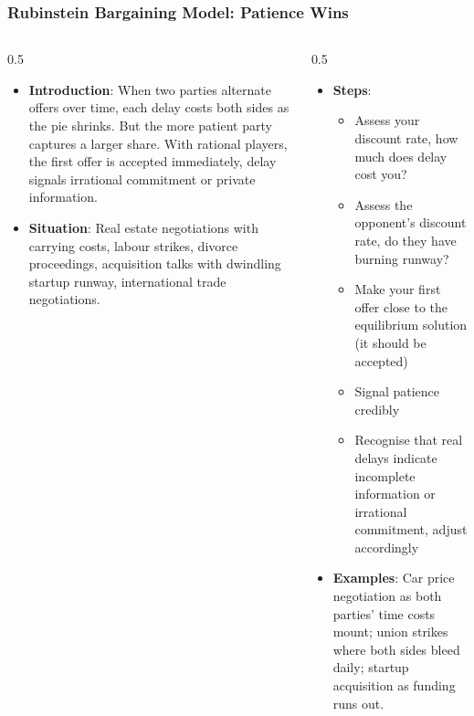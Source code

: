 \begin{frame}[fragile]\frametitle{Rubinstein Bargaining Model: Patience Wins}
\begin{columns}
    \begin{column}[T]{0.5\linewidth}
      \begin{itemize}
        \item \textbf{Introduction}: When two parties alternate offers over time, each delay costs both sides as the pie shrinks. But the more patient party captures a larger share. With rational players, the first offer is accepted immediately, delay signals irrational commitment or private information.
        \item \textbf{Situation}: Real estate negotiations with carrying costs, labour strikes, divorce proceedings, acquisition talks with dwindling startup runway, international trade negotiations.
      \end{itemize}
    \end{column}
    \begin{column}[T]{0.5\linewidth}
      \begin{itemize}
        \item \textbf{Steps}:
        \begin{itemize}
          \item Assess your discount rate, how much does delay cost you?
          \item Assess the opponent's discount rate, do they have burning runway?
          \item Make your first offer close to the equilibrium solution (it should be accepted)
          \item Signal patience credibly
          \item Recognise that real delays indicate incomplete information or irrational commitment, adjust accordingly
        \end{itemize}\item \textbf{Examples}: Car price negotiation as both parties' time costs mount; union strikes where both sides bleed daily; startup acquisition as funding runs out.
      \end{itemize}
    \end{column}
  \end{columns}
\end{frame}


